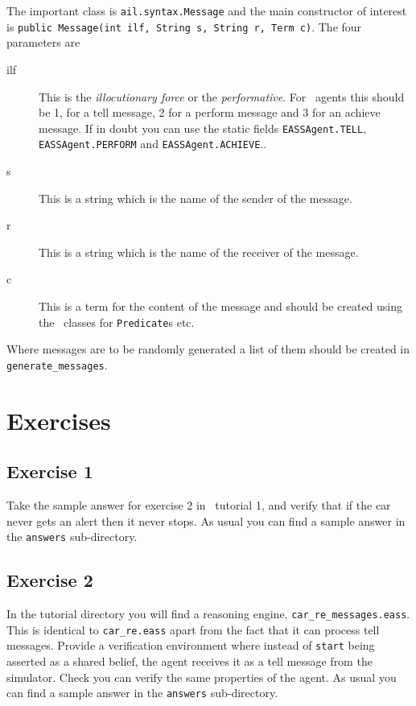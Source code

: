 The important class is \texttt{ail.syntax.Message} and the main constructor of interest is \texttt{public Message(int ilf, String s, String r, Term c)}.  The four parameters are
\begin{description}
\item[ilf] This is the \emph{illocutionary force} or the \emph{performative}.  For \eass\ agents this should be 1, for a tell message, 2 for a perform message and 3 for an achieve message.  If in doubt you can use the static fields \texttt{EASSAgent.TELL}, \texttt{EASSAgent.PERFORM} and \texttt{EASSAgent.ACHIEVE}..
\item[s] This is a string which is the name of the sender of the message.
\item[r] This is a string which is the name of the receiver of the message.
\item[c] This is a term for the content of the message and should be created using the \ail\ classes for \texttt{Predicate}s etc.
\end{description}

Where messages are to be randomly generated a list of them should be created in \texttt{generate\_messages}.

\section{Exercises}

\subsection{Exercise 1}
Take the sample answer for exercise 2 in \eass\ tutorial 1, and verify that if the car never gets an alert then it never stops.  As usual you can find a sample answer in the \texttt{answers} sub-directory.

\subsection{Exercise 2}
In the tutorial directory you will find a reasoning engine, \texttt{car\_re\_messages.eass}.  This is identical to \texttt{car\_re.eass} apart from the fact that it can process tell messages.  Provide a verification environment where instead of \lstinline{start} being asserted as a shared belief, the agent receives it as a tell message from the simulator.  Check you can verify the same properties of the agent.  As usual you can find a sample answer in the \texttt{answers} sub-directory.


